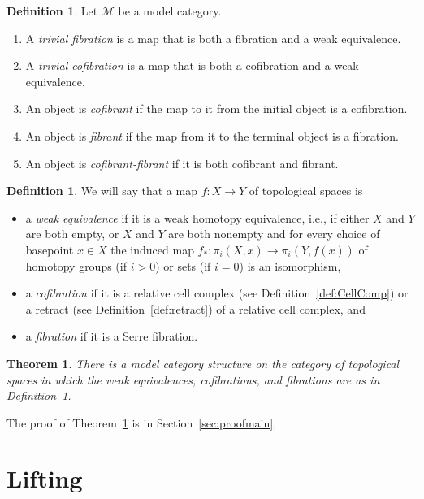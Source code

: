 \documentclass{amsart}
\numberwithin{equation}{section}
\theoremstyle{slplain}
\newtheorem{thm}[equation]{Theorem}  %
\theoremstyle{definition}
\newtheorem{defn}[equation]{Definition} %
\theoremstyle{remark}
\newcommand{\thmref}{Theorem~\ref}
\newcommand{\defref}{Definition~\ref}
\newcommand{\secref}{Section~\ref}
\newcommand{\cat}[1]{\mathcal{#1}}
\begin{document}
\begin{defn}
  \label{def:TrivCof}
  Let $\cat M$ be a model category.
  \begin{enumerate}
  \item A \emph{trivial fibration} is a map that is both a fibration
    and a weak equivalence.
  \item A \emph{trivial cofibration} is a map that is both a
    cofibration and a weak equivalence.
  \item An object is \emph{cofibrant} if the map to it from the
    initial object is a cofibration.
  \item An object is \emph{fibrant} if the map from it to the terminal
    object is a fibration.
  \item An object is \emph{cofibrant-fibrant} if it is both cofibrant
    and fibrant.
  \end{enumerate}
\end{defn}

\begin{defn}
  \label{def:MdCtStr}
  We will say that a map $f\colon X \to Y$ of topological spaces is
  \begin{itemize}
  \item a \emph{weak equivalence} if it is a weak homotopy
    equivalence, i.e., if either $X$ and $Y$ are both empty, or $X$
    and $Y$ are both nonempty and for every choice of basepoint $x \in
    X$ the induced map $f_{*}\colon \pi_{i}(X,x) \to \pi_{i}(Y, f(x))$
    of homotopy groups (if $i > 0$) or sets (if $i = 0$) is an
    isomorphism,
  \item a \emph{cofibration} if it is a relative cell complex (see
    \defref{def:CellComp}) or a retract (see \defref{def:retract}) of
    a relative cell complex, and
  \item a \emph{fibration} if it is a Serre fibration.
  \end{itemize}
\end{defn}


\begin{thm}
  \label{thm:main}
  There is a model category structure on the category of topological
  spaces in which the weak equivalences, cofibrations, and fibrations
  are as in \defref{def:MdCtStr}.
\end{thm}

The proof of \thmref{thm:main} is in \secref{sec:proofmain}.


\section{Lifting}
\label{sec:retracts}
\end{document}
